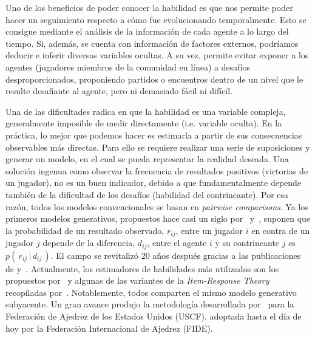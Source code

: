 \documentclass[11pt,twoside, spanish]{report} %
\begin{document}
Uno de los beneficios de poder conocer la habilidad es que nos permite poder hacer un seguimiento respecto a c\'omo fue evolucionando temporalmente.
Esto se consigue mediante el an\'alisis de la informaci\'on de cada agente a lo largo del tiempo.
Si, adem\'as, se cuenta con informaci\'on de factores externos, podr\'iamos deducir e inferir diversas variables ocultas.
A su vez, permite evitar exponer a los agentes (jugadores miembros de la comunidad en l\'inea) a desaf\'ios desproporcionados, proponiendo partidos o encuentros dentro de un nivel que le resulte desafiante al agente, pero ni demasiado f\'acil ni dif\'icil.

Una de las dificultades radica en que la habilidad es una variable compleja, generalmente imposible de medir directamente (i.e. variable oculta).
En la pr\'actica, lo mejor que podemos hacer es estimarla a partir de sus consecuencias observables m\'as directas.
Para ello se requiere realizar una serie de suposiciones y generar un modelo, en el cual se pueda representar la realidad deseada.
Una soluci\'on ingenua como observar la frecuencia de resultados positivos (victorias de un jugador), no es un buen indicador, debido a que fundamentalmente depende tambi\'en de la dificultad de los desaf\'ios (habilidad del contrincante).
Por esa raz\'on, todos los modelos convencionales se basan en \emph{pairwise comparisons}.
Ya los primeros modelos generativos, propuestos hace casi un siglo por~\cite{thurstone1927-comparativeJugement} y~\cite{zermelo1929-translation}, suponen que la probabilidad de un resultado observado, $r_{ij}$, entre un jugador $i$ en contra de un jugador $j$ depende de la diferencia, $d_{ij}$, entre el agente $i$ y su contrincante $j$ es $p(\,r_{ij} \,|\, d_{ij}\,)$.
El campo se revitaliz\'o 20 a\~nos despu\'es gracias a las publicaciones de \cite{bradley1952} y~\cite{mosteller1951a}.
Actualmente, los estimadores de habilidades m\'as utilizados son los propuestos por~\cite{elo1961-uscf,glikman_gliko_2,Herbrich2007} y algunas de las variantes de la \emph{Item-Response Theory} recopiladas por~\cite{vanDerLinden2016,fox2010}.
Notablemente, todos comparten el mismo modelo generativo subyacente.
Un gran avance produjo la metodolog\'ia desarrollada por~\cite{elo1961-uscf} para la Federaci\'on de Ajedrez de los Estados Unidos (USCF), adoptada hasta el d\'ia de hoy por la Federaci\'on Internacional de Ajedrez (FIDE).
\end{document}
